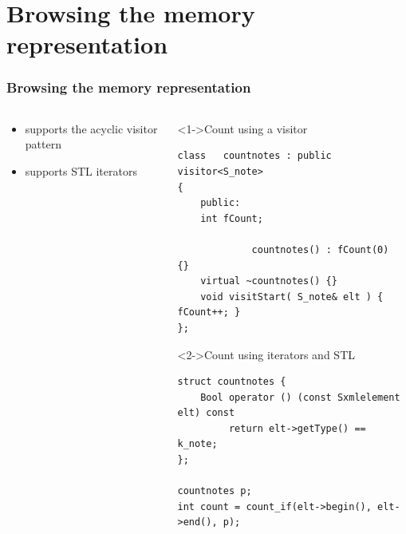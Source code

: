 \documentclass{beamer}
\begin{document}
\section{Browsing the memory representation}
\begin{frame}[fragile]
	\frametitle{Browsing the memory representation}

	\begin{columns}
		\begin{column}[c]{50mm}

\begin{itemize}
			\item<1-> supports the acyclic visitor pattern
		\vspace{25mm}
			\item<2-> supports STL iterators
	   \end{itemize}
		\end{column}

		\begin{column}[c]{65mm}
		\begin{block}<1->{Count using a visitor}
\begin{lstlisting}
class   countnotes : public visitor<S_note>
{
    public:
    int fCount;

             countnotes() : fCount(0)	{}
    virtual ~countnotes() {}
    void visitStart( S_note& elt ) { fCount++; }
};
\end{lstlisting}
		\end{block}

		\begin{block}<2->{Count using iterators and STL}
\begin{lstlisting}
struct countnotes {
    Bool operator () (const Sxmlelement elt) const
         return elt->getType() == k_note;
};

countnotes p;
int count = count_if(elt->begin(), elt->end(), p);
\end{lstlisting}
		\end{block}
		\end{column}
	\end{columns}
\end{frame}

\end{document}
